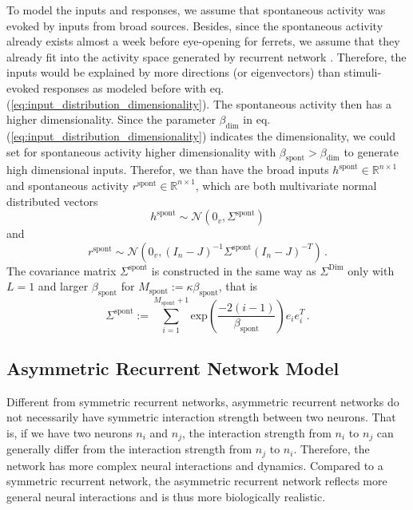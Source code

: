 \documentclass[11pt]{article}
\begin{document}
	To model the inputs and responses, we assume that spontaneous activity was evoked by inputs from broad sources. Besides, since the spontaneous activity already exists almost a week before eye-opening for ferrets, we assume that they already fit into the activity space generated by recurrent network \cite{tragenap2023nature}. Therefore, the inputs would be explained by more directions (or eigenvectors) than stimuli-evoked responses as modeled before with eq.(\ref{eq:input_distribution_dimensionality}). The spontaneous activity then has a higher dimensionality. Since the parameter $\beta_{\text{dim}}$ in eq.(\ref{eq:input_distribution_dimensionality}) indicates the dimensionality, we could set for spontaneous activity higher dimensionality with $\beta_{\text{spont}} > \beta_{\text{dim}}$ to generate high dimensional inputs. 
	Therefor, we than have the broad inputs $h^{\text{spont}} \in \mathbb{R}^{n \times 1}$ and spontaneous activity $r^{\text{spont}} \in \mathbb{R}^{n \times 1}$, which are both multivariate normal distributed vectors 
		\begin{equation}
			h^{\text{spont}} \sim \mathcal{N}(0_v, \Sigma^{\text{spont}})
		\end{equation}
	and 
		\begin{equation}
			r^{\text{spont}} \sim \mathcal{N}\left( 0_v, (I_n - J)^{-1} \Sigma^{\text{spont}}(I_n - J)^{-T}\right) \, .
		\end{equation}
	The covariance matrix $\Sigma^{\text{spont}}$ is constructed in the same way as $\Sigma^{\text{Dim}}$ only with $L=1$ and larger $\beta_{\text{spont}}$ for $M_{\text{spont}} := \kappa \beta_{\text{spont}}$, that is
		\begin{equation} \label{eq:Sigma_spont}
			\Sigma^{\text{spont}} := \sum_{i=1}^{M_{\text{spont}}+1} \text{exp}\left(\frac{-2(i-1)}{\beta_{\text{spont}}}\right) e_i e_i^T \, .
		\end{equation}
	
	\clearpage
	\subsection{Asymmetric Recurrent Network Model} \label{sec:ffrec_asym}
	Different from symmetric recurrent networks, asymmetric recurrent networks do not necessarily have symmetric interaction strength between two neurons. That is, if we have two neurons $n_i$ and $n_j$, the interaction strength from $n_i$ to $n_j$ can generally differ from the interaction strength from $n_j$ to $n_i$. Therefore, the network has more complex neural interactions and dynamics. Compared to a symmetric recurrent network, the asymmetric recurrent network reflects more general neural interactions and is thus more biologically realistic. 
	
\end{document}
